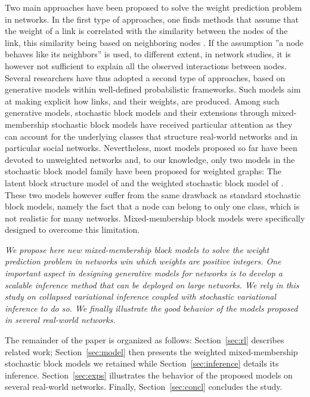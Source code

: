 Two main approaches have been proposed to solve the weight prediction problem in networks. In the first type of approaches, one finds methods that assume that the weight of a link is correlated with the similarity between the nodes of the link, this similarity being based on neighboring nodes \cite{Zhao2015,Zhu2016}. If the assumption ''a node behaves like its neighbors'' is used, to different extent, in network studies, it is however not sufficient to explain all the observed interactions between nodes. Several researchers have thus adopted a second type of approaches, based on generative models within well-defined probabilistic frameworks. Such models aim at making explicit how links, and their weights, are produced. Among such generative models, stochastic block models and their extensions through mixed-membership stochastic block models have received particular attention \cite{ Karrer2011,airoldi2009mixed,iMMSB,fan2015dynamic} as they can account for the underlying classes that structure real-world networks and in particular social networks. Nevertheless, most models proposed so far have been devoted to unweighted networks and, to our knowledge, only two models in the stochastic block model family have been proposed for weighted graphs: The latent block structure model of \cite{aicher2014learning} and the weighted stochastic block model of \cite{peixoto2018nonparametric}. These two models however suffer from the same drawback as standard stochastic block models, namely the fact that a node can belong to only one class, which is not realistic for many networks. Mixed-membership block models were specifically designed to overcome this limitation.

\textit{We propose here new mixed-membership block models to solve the weight prediction problem in networks win which weights are positive integers. One important aspect in designing generative models for networks is to develop a scalable inference method that can be deployed on large networks. We rely in this study on collapsed variational inference coupled with stochastic variational inference to do so. We finally illustrate the good behavior of the models proposed in several real-world networks.}

The remainder of the paper is organized as follows: Section~\ref{sec:rl} describes related work; Section~\ref{sec:model} then presents the weighted mixed-membership stochastic block models we retained while Section~\ref{sec:inference} details its inference. Section~\ref{sec:exps} illustrates the behavior of the proposed models on several real-world networks. Finally, Section~\ref{sec:concl} concludes the study.


